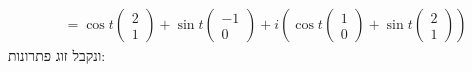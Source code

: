 \documentclass{article}
\begin{document}
\begin{align*}
         & = \cos t \begin{pmatrix}
                        2 \\
                        1
                    \end{pmatrix} + \sin t \begin{pmatrix}
                                               -1 \\
                                               0
                                           \end{pmatrix} + i(\cos t \begin{pmatrix}
                                                                        1 \\
                                                                        0
                                                                    \end{pmatrix}+\sin t \begin{pmatrix}
                                                                                             2 \\
                                                                                             1
                                                                                         \end{pmatrix})
\end{align*}
ונקבל זוג פתרונות:
\end{document}
